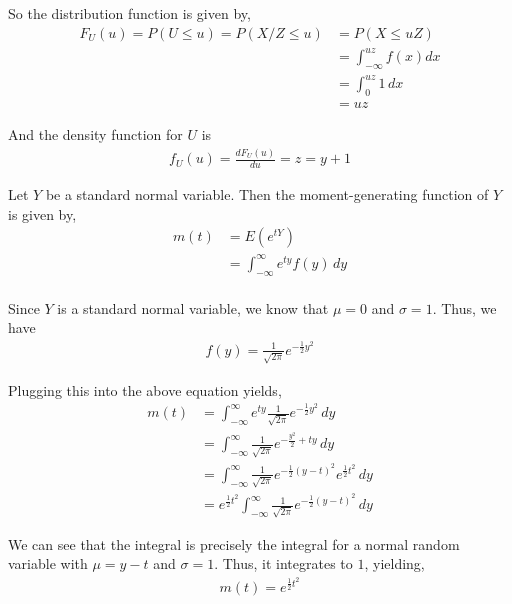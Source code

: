 \documentclass[12pt]{article}
\newenvironment{problem}[2][Problem]{\begin{trivlist}
\item[\hskip \labelsep {\bfseries #1}\hskip \labelsep {\bfseries #2.}]}{\end{trivlist}}
\begin{document}
So the distribution function is given by,
\begin{align*}
F_U(u) = P(U \leq u) = P(X/Z \leq u) &= P(X \leq uZ)\\
&= \int_{-\infty}^{uz} f(x)dx \\
&= \int_0^{uz} 1 \, dx\\
&= uz
\end{align*}

And the density function for $U$ is
\begin{align*}
f_U(u) = \frac{dF_U(u)}{du} = z = y+1
\end{align*}

\begin{problem}{3}
\end{problem}

Let $Y$ be a standard normal variable. Then the moment-generating function of $Y$ is given by,
\begin{align*}
m(t) &= E(e^{tY})\\
&= \int_{-\infty}^{\infty} e^{ty}f(y) \, dy\\
\end{align*}

Since $Y$ is a standard normal variable, we know that $\mu = 0$ and $\sigma = 1$. Thus, we have 
\begin{align*}
f(y) = \frac{1}{\sqrt{2\pi}} e^{-\frac{1}{2}y^2}
\end{align*}

Plugging this into the above equation yields,
\begin{align*}
m(t) &= \int_{-\infty}^{\infty} e^{ty} \frac{1}{\sqrt{2\pi}} e^{-\frac{1}{2}y^2} \, dy\\
&= \int_{-\infty}^{\infty} \frac{1}{\sqrt{2\pi}} e^{-\frac{y^2}{2} + ty} \, dy\\
&= \int_{-\infty}^{\infty} \frac{1}{\sqrt{2\pi}} e^{-\frac{1}{2}(y - t)^2} e^{\frac{1}{2} t^2} \, dy\\
&= e^{\frac{1}{2} t^2} \int_{-\infty}^{\infty} \frac{1}{\sqrt{2\pi}} e^{-\frac{1}{2}(y - t)^2} \, dy
\end{align*}

We can see that the integral is precisely the integral for a normal random variable with $\mu = y - t$ and $\sigma = 1$. Thus, it integrates to $1$, yielding,
\begin{align*}
m(t) = e^{\frac{1}{2} t^2}
\end{align*}
\newpage
\begin{problem}{4}
\end{problem}
\end{document}
